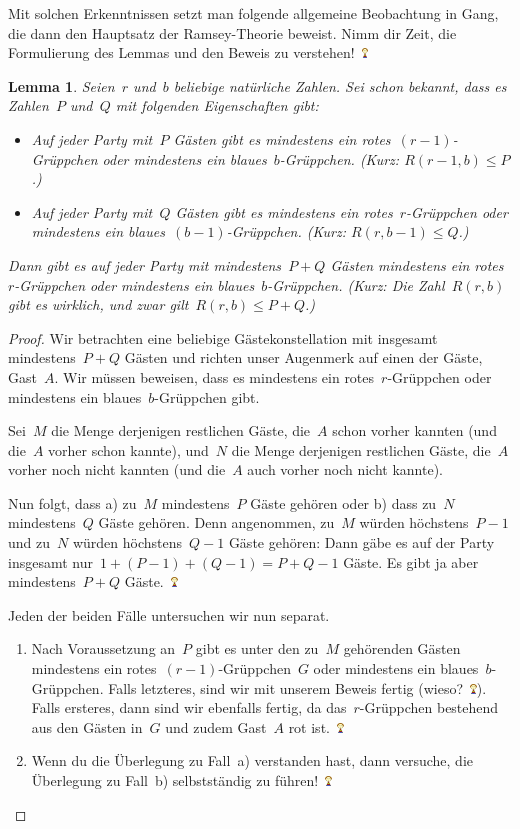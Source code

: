 \documentclass{../../zirkelblatt1718}
\theoremstyle{definition}
\theoremstyle{plain}
\newtheorem{lemma}[defn]{Lemma}
\theoremstyle{remark}
\newcommand{\happy}{\includegraphics[height=0.7em]{happy}\xspace}
\begin{document}
Mit solchen Erkenntnissen setzt man folgende allgemeine Beobachtung in Gang, die
dann den Hauptsatz der Ramsey-Theorie beweist. Nimm dir Zeit, die Formulierung
des Lemmas und den Beweis zu verstehen!~\happy

\begin{lemma}Seien~$r$ und~$b$ beliebige natürliche Zahlen. Sei schon bekannt,
dass es Zahlen~$P$ und~$Q$ mit folgenden Eigenschaften gibt:
\begin{itemize}
\item Auf jeder Party mit~$P$ Gästen gibt es mindestens ein
rotes~$(r-1)$-Grüppchen oder mindestens ein blaues~$b$-Grüppchen.
(Kurz: $R(r-1,b) \leq P$.)
\item Auf jeder Party mit~$Q$ Gästen gibt es mindestens ein
rotes~$r$-Grüppchen oder mindestens ein blaues~$(b-1)$-Grüppchen.
(Kurz: $R(r,b-1) \leq Q$.)
\end{itemize}
Dann gibt es auf jeder Party mit mindestens~$P+Q$ Gästen mindestens ein
rotes~$r$-Grüppchen oder mindestens ein blaues~$b$-Grüppchen. (Kurz: Die
Zahl~$R(r,b)$ gibt es wirklich, und zwar gilt~$R(r,b) \leq P + Q$.)
\end{lemma}

\begin{proof}Wir betrachten eine beliebige Gästekonstellation mit insgesamt
mindestens~$P + Q$ Gästen und richten unser Augenmerk auf einen der Gäste,
Gast~$A$. Wir müssen beweisen, dass es mindestens ein rotes~$r$-Grüppchen oder
mindestens ein blaues~$b$-Grüppchen gibt.

Sei~$M$ die Menge derjenigen restlichen Gäste, die~$A$ schon vorher
kannten (und die~$A$ vorher schon kannte), und~$N$ die Menge derjenigen
restlichen Gäste, die~$A$ vorher noch nicht kannten (und die~$A$ auch vorher
noch nicht kannte).

Nun folgt, dass a) zu~$M$ mindestens~$P$ Gäste gehören oder b) dass zu~$N$
mindestens~$Q$ Gäste gehören. Denn angenommen, zu~$M$ würden höchstens~$P-1$
und zu~$N$ würden höchstens~$Q-1$ Gäste gehören: Dann gäbe es auf der Party
insgesamt nur~$1 + (P-1) + (Q-1) = P+Q-1$ Gäste. Es gibt ja aber
mindestens~$P+Q$ Gäste.~\happy

Jeden der beiden Fälle untersuchen wir nun separat.

\begin{enumerate}
\item Nach Voraussetzung an~$P$ gibt es unter den zu~$M$ gehörenden Gästen
mindestens ein rotes~$(r-1)$-Grüppchen~$G$ oder mindestens ein
blaues~$b$-Grüppchen. Falls letzteres, sind wir mit unserem Beweis
fertig (wieso?~\happy). Falls ersteres, dann sind wir ebenfalls fertig, da
das~$r$-Grüppchen bestehend aus den Gästen in~$G$ und zudem Gast~$A$ rot
ist.~\happy
\item Wenn du die Überlegung zu Fall~a) verstanden hast, dann versuche, die
Überlegung zu Fall~b) selbstständig zu führen!~\happy \qedhere
\end{enumerate}
\end{proof}
\end{document}
